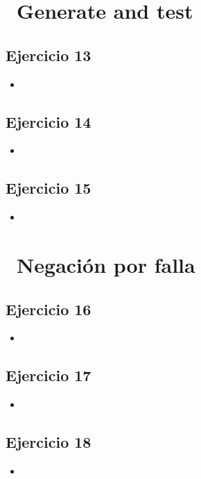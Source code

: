 \documentclass[10pt,a4paper]{article}
\begin{document}
\section*{\ Generate and test}

\subsection{Ejercicio 13}
\begin{itemize}
\item
\end{itemize}

\subsection{Ejercicio 14}
\begin{itemize}
\item
\end{itemize}

\subsection{Ejercicio 15}
\begin{itemize}
\item
\end{itemize}
\section*{\ Negación por falla}

\subsection{Ejercicio 16}
\begin{itemize}
\item
\end{itemize}

\subsection{Ejercicio 17}
\begin{itemize}
\item
\end{itemize}

\subsection{Ejercicio 18}
\begin{itemize}
\item
\end{itemize}
\end{document}
